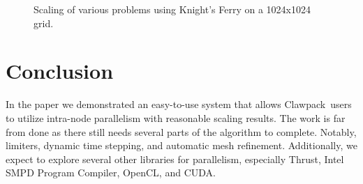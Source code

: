 \documentclass{article}
\def\clawpack{Clawpack~}
\begin{document}
\begin{figure}[ht]
\centering
{}
\label{fig:subfigureExample}
\caption{Scaling of various problems using Knight's Ferry on a 1024x1024 grid.}
\end{figure}

\section{Conclusion}

In the paper we demonstrated an easy-to-use system that allows \clawpack users
to utilize intra-node parallelism with reasonable scaling results.  The work is
far from done as there still needs several parts of the algorithm to complete.
Notably, limiters, dynamic time stepping, and automatic mesh refinement.
Additionally, we expect to explore several other libraries for parallelism,
especially Thrust, Intel SMPD Program Compiler, OpenCL, and CUDA.





\end{document}
